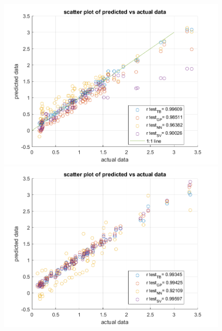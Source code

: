 \documentclass[12pt]{iopart}
\begin{document}
\begin{figure}[ht!]
\begin{center}

\begin{minipage}{0.495\textwidth}
    \includegraphics[width=1\textwidth]{dispWcontrol.png}
\end{minipage}
\begin{minipage}{0.495\textwidth}
    \includegraphics[width=1\textwidth]{disp.png}
\end{minipage}
\begin{minipage}{0.495\textwidth}

\end{minipage}
\end{center}
\end{figure}
\end{document}
